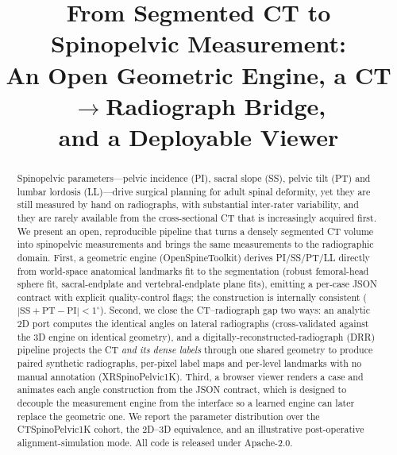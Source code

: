 \documentclass[conference]{IEEEtran}
\newcommand{\dataset}{CTSpinoPelvic1K}
\newcommand{\xrdataset}{XRSpinoPelvic1K}
\newcommand{\ostk}{OpenSpineToolkit}
\begin{document}
\title{From Segmented CT to Spinopelvic Measurement:\\
An Open Geometric Engine, a CT$\rightarrow$Radiograph Bridge,\\ and a Deployable Viewer}

\author{
}

\maketitle

\begin{abstract}
Spinopelvic parameters---pelvic incidence (PI), sacral slope (SS), pelvic tilt (PT)
and lumbar lordosis (LL)---drive surgical planning for adult spinal deformity, yet they
are still measured by hand on radiographs, with substantial inter-rater variability, and
they are rarely available from the cross-sectional CT that is increasingly acquired first.
We present an open, reproducible pipeline that turns a densely segmented CT volume into
spinopelvic measurements and brings the same measurements to the radiographic domain.
First, a geometric engine (\ostk) derives PI/SS/PT/LL directly from world-space anatomical
landmarks fit to the segmentation (robust femoral-head sphere fit, sacral-endplate and
vertebral-endplate plane fits), emitting a per-case JSON contract with explicit
quality-control flags; the construction is internally consistent ($|\mathrm{SS}+\mathrm{PT}-\mathrm{PI}|<1^\circ$).
Second, we close the CT--radiograph gap two ways: an analytic 2D port computes the
identical angles on lateral radiographs (cross-validated against the 3D engine on
identical geometry), and a digitally-reconstructed-radiograph (DRR) pipeline projects the
CT \emph{and its dense labels} through one shared geometry to produce paired synthetic
radiographs, per-pixel label maps and per-level landmarks with no manual annotation
(\xrdataset). Third, a browser viewer renders a case and animates each angle construction
from the JSON contract, which is designed to decouple the measurement engine from the
interface so a learned engine can later replace the geometric one. We report the parameter
distribution over the \dataset{} cohort, the 2D--3D equivalence, and an illustrative
post-operative alignment-simulation mode. All code is released under Apache-2.0.
\end{abstract}
\end{document}
